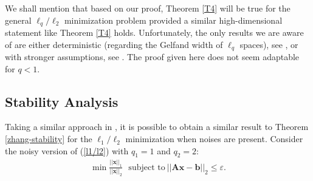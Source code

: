 \documentclass[11pt]{article}
\numberwithin{equation}{section}
\theoremstyle{plain}
\theoremstyle{definition}
\def\A{{\mathbf A}}
\def\x{{\mathbf x}}
\def\b{{\mathbf b}}
\def\e{{\varepsilon}}
\begin{document}
We shall mention that based on our proof, Theorem \ref{T4} will be true for the general $\ell_q/\ell_2$ minimization problem provided a similar high-dimensional statement like Theorem \ref{T4} holds. Unfortunately, the only results we are aware of are either deterministic (regarding the Gelfand width of $\ell_q$ spaces), see \cite{foucart2010gelfand}, or with stronger assumptions, see \cite{donoho2006compressed}. The proof given here does not seem adaptable for $q<1$.   




\subsection{Stability Analysis}

Taking a similar approach in \cite{zhang2013theory}, it is possible to obtain a similar result to Theorem \ref{zhang-stability} for the $\ell_1/\ell_2$ minimization when noises are present. Consider the noisy version of (\ref{l1/l2}) with $q_1=1$ and $q_2=2$: 
\begin{align}
\min\frac{||\x||_1}{||\x||_2} \ \ \ \text{subject to}\ ||\A\x-\b||_2\leq\e.\label{777}
\end{align}
\end{document}
